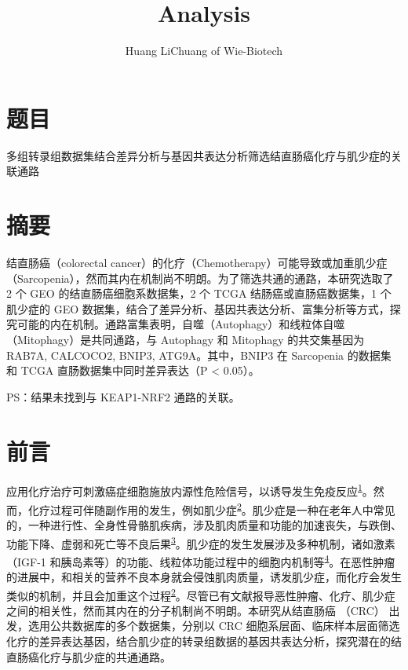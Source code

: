 \documentclass[
]{article}
\title{Analysis}
\author{Huang LiChuang of Wie-Biotech}
\date{}
\begin{document}
\maketitle

{
\setcounter{tocdepth}{3}
\tableofcontents
}
\listoffigures

\listoftables

\hypertarget{ux9898ux76ee}{%
\section{题目}\label{ux9898ux76ee}}

多组转录组数据集结合差异分析与基因共表达分析筛选结直肠癌化疗与肌少症的关联通路

\hypertarget{abstract}{%
\section{摘要}\label{abstract}}

结直肠癌（colorectal cancer）的化疗（Chemotherapy）可能导致或加重肌少症（Sarcopenia），然而其内在机制尚不明朗。为了筛选共通的通路，本研究选取了 2 个 GEO 的结直肠癌细胞系数据集，2 个 TCGA 结肠癌或直肠癌数据集，1 个 肌少症的 GEO 数据集，结合了差异分析、基因共表达分析、富集分析等方式，探究可能的内在机制。通路富集表明，自噬（Autophagy）和线粒体自噬（Mitophagy）是共同通路，与 Autophagy 和 Mitophagy 的共交集基因为 RAB7A, CALCOCO2, BNIP3, ATG9A。其中，BNIP3 在 Sarcopenia 的数据集和 TCGA 直肠数据集中同时差异表达（P \textless{} 0.05）。

PS：结果未找到与 KEAP1-NRF2 通路的关联。

\hypertarget{introduction}{%
\section{前言}\label{introduction}}

应用化疗治疗可刺激癌症细胞施放内源性危险信号，以诱导发生免疫反应\textsuperscript{\protect\hyperlink{ref-DangerSignalsVargas2017}{1}}。然而，化疗过程可伴随副作用的发生，例如肌少症\textsuperscript{\protect\hyperlink{ref-ChemotherapyInBozzet2020}{2}}。肌少症是一种在老年人中常见的，一种进行性、全身性骨骼肌疾病，涉及肌肉质量和功能的加速丧失，与跌倒、功能下降、虚弱和死亡等不良后果\textsuperscript{\protect\hyperlink{ref-SarcopeniaCruzJ2019}{3}}。肌少症的发生发展涉及多种机制，诸如激素（IGF-1 和胰岛素等）的功能、线粒体功能过程中的细胞内机制等\textsuperscript{\protect\hyperlink{ref-SarcopeniaMoWiedme2021}{4}}。在恶性肿瘤的进展中，和相关的营养不良本身就会侵蚀肌肉质量，诱发肌少症，而化疗会发生类似的机制，并且会加重这个过程\textsuperscript{\protect\hyperlink{ref-ChemotherapyInBozzet2020}{2}}。尽管已有文献报导恶性肿瘤、化疗、肌少症之间的相关性，然而其内在的分子机制尚不明朗。本研究从结直肠癌 （CRC） 出发，选用公共数据库的多个数据集，分别以 CRC 细胞系层面、临床样本层面筛选化疗的差异表达基因，结合肌少症的转录组数据的基因共表达分析，探究潜在的结直肠癌化疗与肌少症的共通通路。
\end{document}
